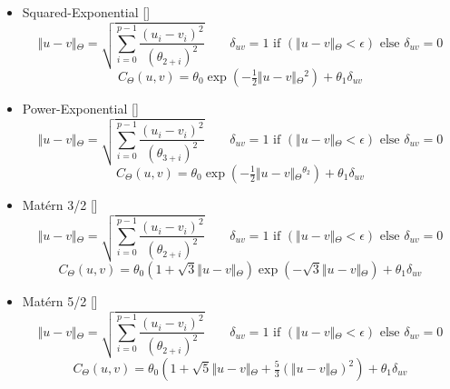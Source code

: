 \begin{itemize}
\item Squared-Exponential []
\[ \Vert{}u-v\Vert{}_\Theta{} = \sqrt{\sum_{i=0}^{p-1} \frac{(u_i - v_i)^2}{(\theta{}_{2+i})^2}} \qquad
 \delta{}_{uv} = 1 \text{ if } (\Vert{}u-v\Vert{}_\Theta{} < \epsilon{}) \textrm{ else } \delta{}_{uv} = 0 \]
\[ C_\Theta{}(u, v) = \theta{}_0 \exp\left({-\tfrac{1}{2} \Vert{}u-v\Vert{}_\Theta{}^2}\right) + \theta{}_1\delta{}_{uv} \]

\item {Power-Exponential}
[]
\[ \Vert{}u-v\Vert{}_\Theta{} = \sqrt{\sum_{i=0}^{p-1} \frac{(u_i - v_i)^2}{(\theta{}_{3+i})^2}} \qquad
 \delta{}_{uv} = 1 \text{ if } (\Vert{}u-v\Vert{}_\Theta{} < \epsilon{}) \textrm{ else } \delta{}_{uv} = 0 \]
\[ C_\Theta{}(u, v) = \theta{}_0 \exp\left({-\tfrac{1}{2} \Vert{}u-v\Vert{}_\Theta{}^{\theta{}_2}}\right) + \theta{}_1\delta{}_{uv} \]

\item {Mat\'{e}rn 3/2}
[]
\[ \Vert{}u-v\Vert{}_\Theta{} = \sqrt{\sum_{i=0}^{p-1} \frac{(u_i - v_i)^2}{(\theta{}_{2+i})^2}} \qquad
 \delta{}_{uv} = 1 \text{ if } (\Vert{}u-v\Vert{}_\Theta{} < \epsilon{}) \textrm{ else } \delta{}_{uv} = 0 \]
\[ C_\Theta{}(u, v) = {\theta{}_0} \left({ 1 + \sqrt{3} \Vert{}u-v\Vert{}_\Theta{} }\right)
\exp \left({ - \sqrt{3} \Vert{}u-v\Vert{}_\Theta{} }\right) + \theta{}_1\delta{}_{uv} \]


\item {Mat\'{e}rn 5/2}
[]
\[ \Vert{}u-v\Vert{}_\Theta{} = \sqrt{\sum_{i=0}^{p-1} \frac{(u_i - v_i)^2}{(\theta{}_{2+i})^2}} \qquad
 \delta{}_{uv} = 1 \text{ if } (\Vert{}u-v\Vert{}_\Theta{} < \epsilon{}) \textrm{ else } \delta{}_{uv} = 0 \]
\[ C_\Theta{}(u, v) = {\theta{}_0} \left({ 1 + \sqrt{5} \Vert{}u-v\Vert{}_\Theta{}
 + \tfrac{5}{3} \left({\Vert{}u-v\Vert{}_\Theta{}}\right)^2  }\right) + \theta{}_1\delta{}_{uv} \]
\end{itemize}

